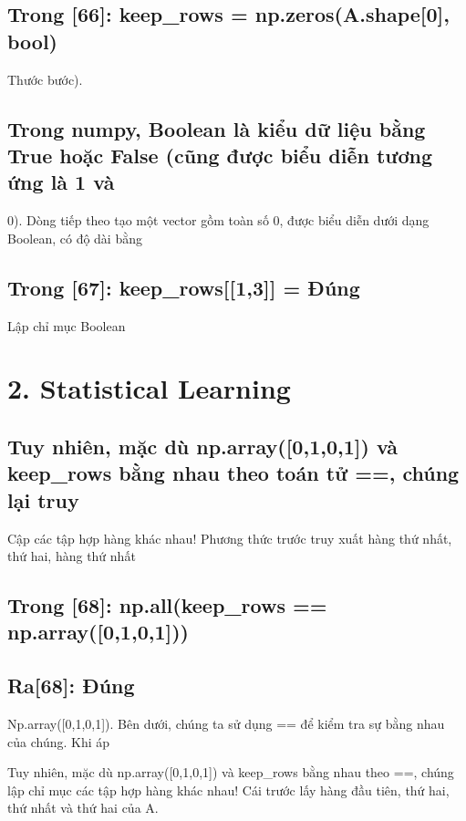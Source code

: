 \subsection{Trong [66]: keep\_rows = np.zeros(A.shape[0], bool)}

Thước bước).

\subsection{Trong numpy, Boolean là kiểu dữ liệu bằng True hoặc False (cũng được biểu diễn tương ứng là 1 và}

0). Dòng tiếp theo tạo một vector gồm toàn số 0, được biểu diễn dưới dạng Boolean, có độ dài bằng

\subsection{Trong [67]: keep\_rows[[1,3]] = Đúng}

Lập chỉ mục Boolean

\section{2. Statistical Learning}

\subsection{Tuy nhiên, mặc dù np.array([0,1,0,1]) và keep\_rows bằng nhau theo toán tử ==, chúng lại truy}

Cập các tập hợp hàng khác nhau! Phương thức trước truy xuất hàng thứ nhất, thứ hai, hàng thứ nhất

\subsection{Trong [68]: np.all(keep\_rows == np.array([0,1,0,1]))}

\subsection{Ra[68]: Đúng}

Np.array([0,1,0,1]). Bên dưới, chúng ta sử dụng == để kiểm tra sự bằng nhau của chúng. Khi áp

Tuy nhiên, mặc dù np.array([0,1,0,1]) và keep\_rows bằng nhau theo ==, chúng lập chỉ mục các tập hợp hàng khác nhau! Cái trước lấy hàng đầu tiên, thứ hai, thứ nhất và thứ hai của A.

